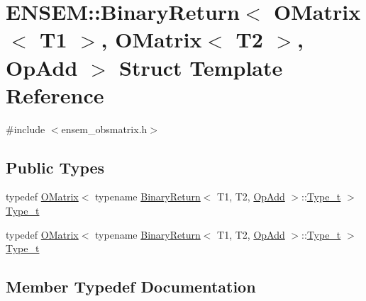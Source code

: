 \hypertarget{structENSEM_1_1BinaryReturn_3_01OMatrix_3_01T1_01_4_00_01OMatrix_3_01T2_01_4_00_01OpAdd_01_4}{}\section{E\+N\+S\+EM\+:\+:Binary\+Return$<$ O\+Matrix$<$ T1 $>$, O\+Matrix$<$ T2 $>$, Op\+Add $>$ Struct Template Reference}
\label{structENSEM_1_1BinaryReturn_3_01OMatrix_3_01T1_01_4_00_01OMatrix_3_01T2_01_4_00_01OpAdd_01_4}


{\ttfamily \#include $<$ensem\+\_\+obsmatrix.\+h$>$}

\subsection*{Public Types}
\begin{DoxyCompactItemize}
\item 
typedef \mbox{\hyperlink{classENSEM_1_1OMatrix}{O\+Matrix}}$<$ typename \mbox{\hyperlink{structENSEM_1_1BinaryReturn}{Binary\+Return}}$<$ T1, T2, \mbox{\hyperlink{structENSEM_1_1OpAdd}{Op\+Add}} $>$\+::\mbox{\hyperlink{structENSEM_1_1BinaryReturn_3_01OMatrix_3_01T1_01_4_00_01OMatrix_3_01T2_01_4_00_01OpAdd_01_4_a7de7198d32f38f8553233464ed23acd4}{Type\+\_\+t}} $>$ \mbox{\hyperlink{structENSEM_1_1BinaryReturn_3_01OMatrix_3_01T1_01_4_00_01OMatrix_3_01T2_01_4_00_01OpAdd_01_4_a7de7198d32f38f8553233464ed23acd4}{Type\+\_\+t}}
\item 
typedef \mbox{\hyperlink{classENSEM_1_1OMatrix}{O\+Matrix}}$<$ typename \mbox{\hyperlink{structENSEM_1_1BinaryReturn}{Binary\+Return}}$<$ T1, T2, \mbox{\hyperlink{structENSEM_1_1OpAdd}{Op\+Add}} $>$\+::\mbox{\hyperlink{structENSEM_1_1BinaryReturn_3_01OMatrix_3_01T1_01_4_00_01OMatrix_3_01T2_01_4_00_01OpAdd_01_4_a7de7198d32f38f8553233464ed23acd4}{Type\+\_\+t}} $>$ \mbox{\hyperlink{structENSEM_1_1BinaryReturn_3_01OMatrix_3_01T1_01_4_00_01OMatrix_3_01T2_01_4_00_01OpAdd_01_4_a7de7198d32f38f8553233464ed23acd4}{Type\+\_\+t}}
\end{DoxyCompactItemize}


\subsection{Member Typedef Documentation}
\mbox{\label{structENSEM_1_1BinaryReturn_3_01OMatrix_3_01T1_01_4_00_01OMatrix_3_01T2_01_4_00_01OpAdd_01_4_a7de7198d32f38f8553233464ed23acd4}} 
